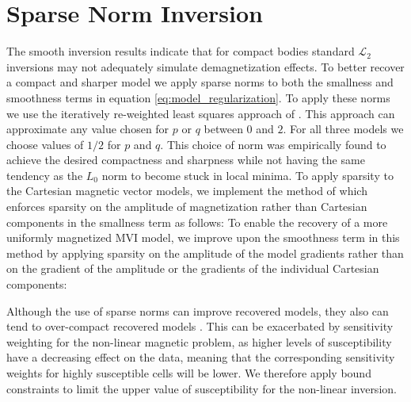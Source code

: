 \documentclass{segabs}
\begin{document}
\section{Sparse Norm Inversion}
\vspace{-0.25cm}

The smooth inversion  results indicate that for compact bodies standard  $\mathcal{L}_2$ inversions may not adequately simulate demagnetization effects. To better recover a compact and sharper model we apply sparse norms to both the smallness and smoothness terms in equation \ref{eq:model_regularization}. To apply these norms we use the iteratively re-weighted least squares approach of \cite{Fournier2019}. This approach can approximate any value chosen for $p$ or $q$ between $0$ and $2$. For all three models we choose values of $1/2$ for $p$ and $q$. This choice of norm was empirically found to achieve the desired compactness and sharpness while not having the same tendency as the $L_0$ norm to become stuck in local minima. To apply sparsity to the Cartesian magnetic vector models, we implement the method of \cite{Ghalenhnoee2021} which enforces sparsity on the amplitude of magnetization rather than Cartesian components in the smallness term as follows:
To enable the recovery of a more uniformly magnetized MVI model, we improve upon the smoothness term in this method by applying sparsity on the amplitude of the model gradients rather than on the gradient of the amplitude or the gradients of the individual Cartesian components:


Although the use of sparse norms can improve recovered models, they also can tend to over-compact recovered models \citep{Li2018}. This can be exacerbated by sensitivity weighting for the non-linear magnetic problem, as higher levels of susceptibility have a decreasing effect on the data, meaning that the corresponding sensitivity weights for highly susceptible cells will be lower. We therefore apply bound constraints to limit the upper value of susceptibility for the non-linear inversion.


\end{document}
